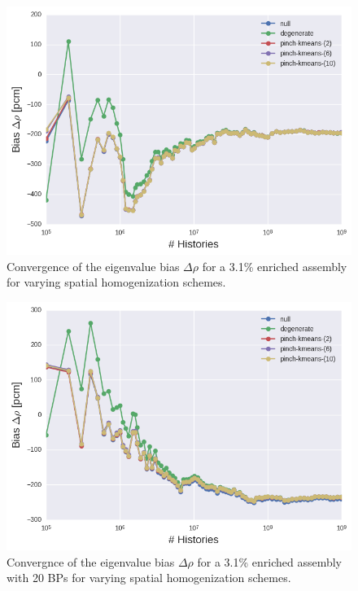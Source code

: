 \begin{figure}[h!]
\centering
\includegraphics[width=0.85\linewidth]{figures/results/assm-31/pca-transform/keff-bias}
\vspace{2mm}
\caption[Eigenvalue bias covergence for a 3.1\% enriched assembly]{Convergence of the eigenvalue bias $\Delta\rho$ for a 3.1\% enriched assembly for varying spatial homogenization schemes.}
\label{fig:chap11-assm-3.1-eigenvalue-converge}
\end{figure}

\clearpage

\begin{figure}[h!]
\centering
\includegraphics[width=0.85\linewidth]{figures/results/assm-31-20BPs/no-transform/keff-bias}
\vspace{2mm}
\caption[Eigenvalue bias covergence for a 3.1\% enriched assembly with 20 \acp{BP}]{Convergnce of the eigenvalue bias $\Delta\rho$ for a 3.1\% enriched assembly with 20 \acp{BP} for varying spatial homogenization schemes.}
\label{fig:chap11-assm-3.1-20BPs-eigenvalue-converge}
\end{figure}


